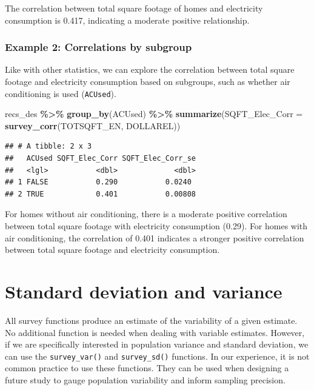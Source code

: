 \documentclass[
]{krantz}
\makeatletter
\newenvironment{Shaded}{\begin{snugshade}}{\end{snugshade}}
\newcommand{\AttributeTok}[1]{\textcolor[rgb]{0.27,0.27,0.27}{#1}}
\newcommand{\FunctionTok}[1]{\textcolor[rgb]{0.27,0.27,0.27}{\textbf{#1}}}
\newcommand{\NormalTok}[1]{#1}
\newcommand{\SpecialCharTok}[1]{\textcolor[rgb]{0.43,0.43,0.43}{\textbf{#1}}}
\newenvironment{kframe}{%
\medskip{}
\setlength{\fboxsep}{.8em}
 \def\at@end@of@kframe{}%
 \ifinner\ifhmode%
  \def\at@end@of@kframe{\end{minipage}}%
  \begin{minipage}{\columnwidth}%
 \fi\fi%
 \def\FrameCommand##1{\hskip\@totalleftmargin \hskip-\fboxsep
 \colorbox{shadecolor}{##1}\hskip-\fboxsep
     \hskip-\linewidth \hskip-\@totalleftmargin \hskip\columnwidth}%
 \MakeFramed {\advance\hsize-\width
   \@totalleftmargin\z@ \linewidth\hsize
   \@setminipage}}%
 {\par\unskip\endMakeFramed%
 \at@end@of@kframe}
\renewenvironment{Shaded}{\begin{kframe}}{\end{kframe}}
\makeatother
\begin{document}
The correlation between total square footage of homes and electricity consumption is 0.417, indicating a moderate positive relationship.

\hypertarget{example-2-correlations-by-subgroup}{%
\subsubsection*{Example 2: Correlations by subgroup}\label{example-2-correlations-by-subgroup}}


Like with other statistics, we can explore the correlation between total square footage and electricity consumption based on subgroups, such as whether air conditioning is used (\texttt{ACUsed}).

\begin{Shaded}
\begin{Highlighting}[]
\NormalTok{recs\_des }\SpecialCharTok{\%\textgreater{}\%}
  \FunctionTok{group\_by}\NormalTok{(ACUsed) }\SpecialCharTok{\%\textgreater{}\%}
  \FunctionTok{summarize}\NormalTok{(}\AttributeTok{SQFT\_Elec\_Corr =} \FunctionTok{survey\_corr}\NormalTok{(TOTSQFT\_EN, DOLLAREL))}
\end{Highlighting}
\end{Shaded}

\begin{verbatim}
## # A tibble: 2 x 3
##   ACUsed SQFT_Elec_Corr SQFT_Elec_Corr_se
##   <lgl>           <dbl>             <dbl>
## 1 FALSE           0.290           0.0240 
## 2 TRUE            0.401           0.00808
\end{verbatim}

For homes without air conditioning, there is a moderate positive correlation between total square footage with electricity consumption (0.29). For homes with air conditioning, the correlation of 0.401 indicates a stronger positive correlation between total square footage and electricity consumption.

\hypertarget{standard-deviation-and-variance}{%
\section{Standard deviation and variance}\label{standard-deviation-and-variance}}

All survey functions produce an estimate of the variability of a given estimate. No additional function is needed when dealing with variable estimates. However, if we are specifically interested in population variance and standard deviation, we can use the \texttt{survey\_var()} and \texttt{survey\_sd()} functions. In our experience, it is not common practice to use these functions. They can be used when designing a future study to gauge population variability and inform sampling precision.
\end{document}
